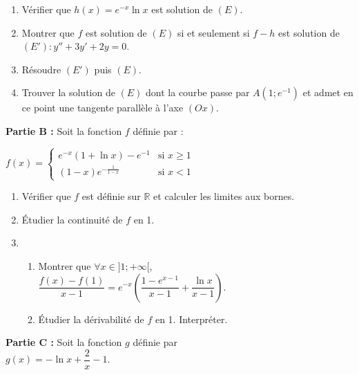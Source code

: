 \documentclass[12pt,a4paper]{article}
\begin{document}
\begin{multicols}{2}
\begin{enumerate}
    \item Vérifier que \( h(x) = e^{-x} \ln x \) est solution de \( (E) \).
    
    \item Montrer que \( f \) est solution de \( (E) \) si et seulement si \( f - h \) est solution de  \\
    \( (E') : y'' + 3y' + 2y = 0 \).
    
    \item Résoudre \( (E') \) puis \( (E) \).
    
    \item Trouver la solution de \( (E) \) dont la courbe passe par \( A(1 ; e^{-1}) \) et admet en ce point une tangente parallèle à l’axe \( (Ox) \).
\end{enumerate}

\vspace{0.3cm}

\textbf{Partie B :} Soit la fonction \( f \) définie par :

\( f(x) =
\begin{cases}
e^{-x}(1 + \ln x) - e^{-1} & \text{si } x \geq 1 \\
(1 - x)e^{-\frac{1}{1 - x}} & \text{si } x < 1
\end{cases} \)

\begin{enumerate}
    \item Vérifier que \( f \) est définie sur \( \mathbb{R} \) et calculer les limites aux bornes.
    
    \item Étudier la continuité de \( f \) en 1.
    
    \item 
    \begin{enumerate}
        \item Montrer que \( \forall x \in ]1 ; +\infty[ \),\\  
        \( \dfrac{f(x) - f(1)}{x - 1} = e^{-x} \left( \dfrac{1 - e^{x-1}}{x - 1} + \dfrac{\ln x}{x - 1} \right) \).
        
        \item Étudier la dérivabilité de \( f \) en 1. Interpréter.
    \end{enumerate}
\end{enumerate}

\vspace{0.3cm}

\textbf{Partie C :} Soit la fonction \( g \) définie par\\  
\( g(x) = -\ln x + \dfrac{2}{x} - 1 \).


\end{multicols}
\end{document}
